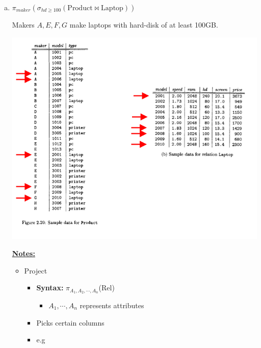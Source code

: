 \documentclass[12pt]{article}
\begin{document}
\begin{enumerate}
\begin{enumerate}[a)]
        \item

        $\pi_{maker}(\sigma_{hd \geq 100}(\text{Product} \bowtie \text{Laptop}))$

        \bigskip

        Makers $A,E,F,G$ make laptops with hard-disk of at least 100GB.

        \bigskip

        \begin{center}
        \includegraphics[width=\linewidth]{images/worksheet_2_solution_7.png}
        \end{center}

        \underline{\textbf{Notes:}}

        \bigskip

        \begin{itemize}
            \item Project
            \begin{itemize}
                \item \textbf{Syntax:} $\pi_{A_1, A_2, \cdots, A_n}$(Rel)
                \begin{itemize}
                    \item $A_1,\cdots,A_n$ represents attributes
                \end{itemize}
                \item Picks certain columns
                \item e.g

                \bigskip


\end{itemize}
\end{itemize}
\end{enumerate}
\end{enumerate}
\end{document}
